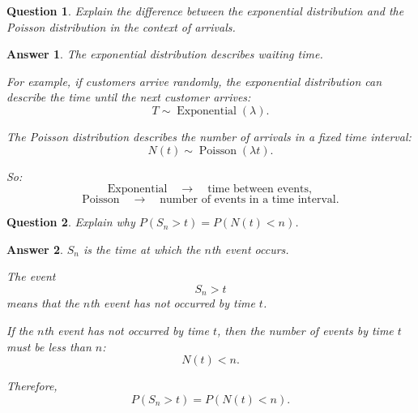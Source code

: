 \documentclass[12pt]{article}
\newtheorem{question}{Question}
\newtheorem*{answer}{Answer}
\begin{document}
\begin{question}
Explain the difference between the exponential distribution and the Poisson distribution in the context of arrivals.
\end{question}

\begin{answer}
The exponential distribution describes waiting time.

For example, if customers arrive randomly, the exponential distribution can describe the time until the next customer arrives:
\[
T\sim \operatorname{Exponential}(\lambda).
\]

The Poisson distribution describes the number of arrivals in a fixed time interval:
\[
N(t)\sim \operatorname{Poisson}(\lambda t).
\]

So:
\[
\text{Exponential} \quad \longrightarrow \quad \text{time between events},
\]
\[
\text{Poisson} \quad \longrightarrow \quad \text{number of events in a time interval}.
\]
\end{answer}

\begin{question}
Explain why \(P(S_n>t)=P(N(t)<n)\).
\end{question}

\begin{answer}
\(S_n\) is the time at which the \(n\)th event occurs.

The event
\[
S_n>t
\]
means that the \(n\)th event has not occurred by time \(t\).

If the \(n\)th event has not occurred by time \(t\), then the number of events by time \(t\) must be less than \(n\):
\[
N(t)<n.
\]

Therefore,
\[
\boxed{P(S_n>t)=P(N(t)<n).}
\]
\end{answer}
\end{document}
